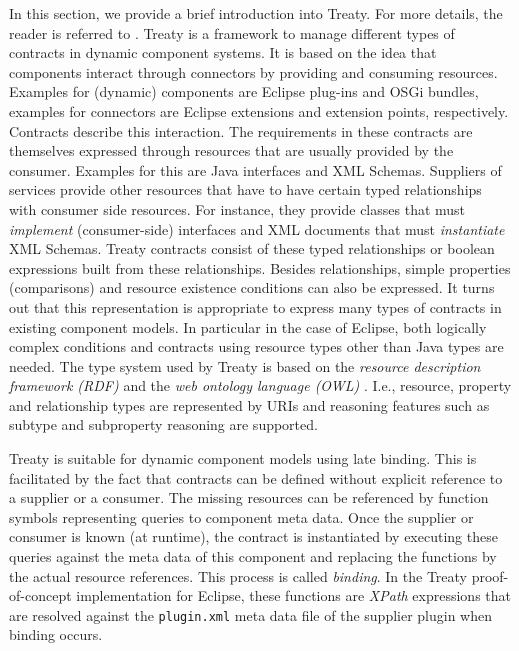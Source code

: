 \documentclass{llncs}
\begin{document}
In this section, we provide a brief introduction into Treaty. For more details, the reader is referred to \cite{Treaty.JOT2009}. Treaty is a framework to manage different types of contracts in dynamic component systems. It is based on the idea that components interact through connectors by providing and consuming resources. Examples for (dynamic) components are Eclipse plug-ins and OSGi bundles, examples for connectors are Eclipse extensions and extension points, respectively. Contracts describe this interaction. The requirements in these contracts are themselves expressed through resources that are usually provided by the consumer. Examples for this are Java interfaces and XML Schemas. Suppliers of services provide other resources that have to have certain typed relationships with consumer side resources. For instance, they provide classes that must \textit{implement} (consumer-side) 
interfaces and XML documents that must \textit{instantiate} XML Schemas. Treaty contracts consist of these typed relationships or boolean expressions built from these relationships. Besides relationships, simple properties (comparisons) and resource existence conditions can also be expressed. It turns out that this representation is appropriate to express many types of contracts in existing component models. In particular in the case of Eclipse,  both logically complex conditions and contracts using resource types other than Java types are needed. The type system used by Treaty is based on the \textit{resource description framework (RDF)} \cite{RDF} and the \textit{web ontology language (OWL)} \cite{OWL}. I.e., resource, property and relationship types are represented by URIs and reasoning features such as subtype and subproperty reasoning are supported. 

Treaty is suitable for dynamic component models using late binding. This is facilitated by the fact that contracts can be defined without explicit reference to a supplier or a consumer. The missing resources can be referenced by function symbols representing queries to component meta data. Once the supplier or consumer is known (at runtime), the contract is instantiated by executing these queries against the meta data of this component and replacing the functions by the actual resource references. This process is called \textit{binding}. In the Treaty proof-of-concept implementation for Eclipse, these functions are \textit{XPath} expressions that are resolved against the \texttt{plugin.xml} meta data file of the supplier plugin when binding occurs. 
\end{document}

